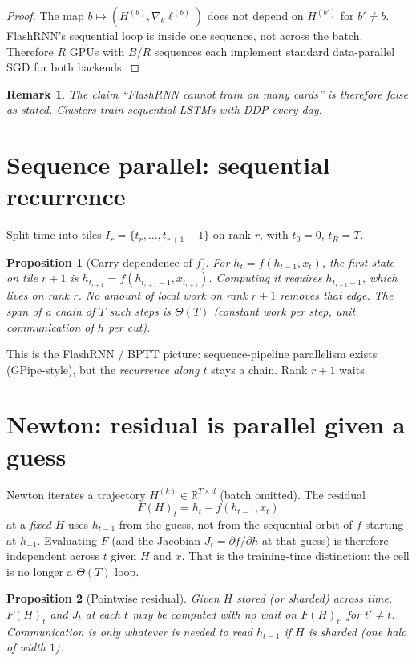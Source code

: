 \documentclass[11pt]{article}
\theoremstyle{plain}
\newtheorem{proposition}{Proposition}
\newtheorem{remark}{Remark}
\begin{document}
\begin{proof}
The map $b \mapsto (H^{(b)}, \nabla_\theta \ell^{(b)})$ does not depend on
$H^{(b')}$ for $b'\neq b$. FlashRNN's sequential loop is inside one sequence,
not across the batch. Therefore $R$ GPUs with $B/R$ sequences each implement
standard data-parallel SGD for both backends.
\end{proof}

\begin{remark}
The claim ``FlashRNN cannot train on many cards'' is therefore false as
stated. Clusters train sequential LSTMs with DDP every day.
\end{remark}

\section{Sequence parallel: sequential recurrence}

Split time into tiles $I_r = \{t_r,\ldots,t_{r+1}-1\}$ on rank $r$, with
$t_0=0$, $t_R=T$.

\begin{proposition}[Carry dependence of $f$]
\label{prop:seq}
For $h_t = f(h_{t-1}, x_t)$, the first state on tile $r{+}1$ is
$h_{t_{r+1}} = f(h_{t_{r+1}-1}, x_{t_{r+1}})$. Computing it requires
$h_{t_{r+1}-1}$, which lives on rank $r$. No amount of local work on rank
$r{+}1$ removes that edge. The span of a chain of $T$ such steps is
$\Theta(T)$ (constant work per step, unit communication of $h$ per cut).
\end{proposition}

This is the FlashRNN / BPTT picture: sequence-pipeline parallelism exists
(GPipe-style), but the \emph{recurrence along $t$} stays a chain. Rank
$r{+}1$ waits.

\section{Newton: residual is parallel given a guess}

Newton iterates a trajectory $H^{(k)}\in\mathbb{R}^{T\times d}$ (batch omitted).
The residual
\[
F(H)_t = h_t - f(h_{t-1}, x_t)
\]
at a \emph{fixed} $H$ uses $h_{t-1}$ from the guess, not from the sequential
orbit of $f$ starting at $h_{-1}$. Evaluating $F$ (and the Jacobian
$J_t = \partial f/\partial h$ at that guess) is therefore independent across
$t$ given $H$ and $x$. That is the training-time distinction: the cell is no
longer a $\Theta(T)$ loop.

\begin{proposition}[Pointwise residual]
\label{prop:F}
Given $H$ stored (or sharded) across time, $F(H)_t$ and $J_t$ at each $t$
may be computed with no wait on $F(H)_{t'}$ for $t'\neq t$. Communication is
only whatever is needed to read $h_{t-1}$ if $H$ is sharded (one halo of
width $1$).
\end{proposition}
\end{document}
